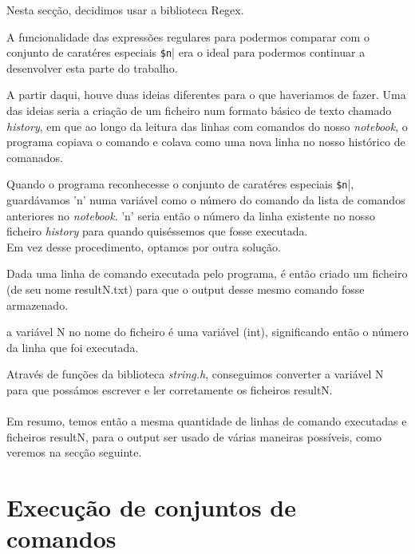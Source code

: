 \documentclass[11pt,a4paper]{report}
\begin{document}
Nesta secção, decidimos usar a biblioteca Regex.


A funcionalidade das expressões regulares para podermos comparar com o conjunto de caratéres especiais \verb|$n|| era o ideal para podermos continuar a desenvolver esta parte do trabalho.

A partir daqui, houve duas ideias diferentes para o que haveriamos de fazer. Uma das ideias seria a criação de um ficheiro num formato básico de texto chamado \textit{history}, em que ao longo da leitura das linhas com comandos do nosso \textit{notebook}, o programa copiava o comando e colava como uma nova linha no nosso histórico de comanados. 

Quando o programa reconhecesse o conjunto de caratéres especiais \verb|$n||, guardávamos 'n' numa variável como o número do comando da lista de comandos anteriores no \textit{notebook}. 'n' seria então o número da linha existente no nosso ficheiro \textit{history} para quando quiséssemos que fosse executada.
~\\

Em vez desse procedimento, optamos por outra solução.

Dada uma linha de comando executada pelo programa, é então criado um ficheiro (de seu nome resultN.txt) para que o output desse mesmo comando fosse armazenado.

a variável N no nome do ficheiro é uma variável (int), significando então o número da linha que foi executada.

Através de funções da biblioteca \textit{string.h}, conseguimos converter a variável N para que possámos escrever e ler corretamente os ficheiros resultN.
~\\


 ~\\

Em resumo, temos então a mesma quantidade de linhas de comando executadas e ficheiros resultN, para o output ser usado de várias maneiras possíveis, como veremos na secção seguinte. 
\pagebreak
\section{Execução de conjuntos de comandos}
\end{document}
